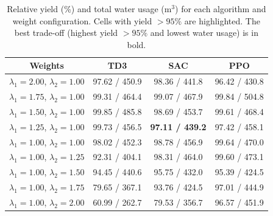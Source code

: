 \begin{table}[ht]
                    \label{tab:rl_wms_results}
                    \caption{Relative yield (\%) and total water usage (m$^3$) for each algorithm and weight configuration. Cells with yield $>95\%$ are highlighted. The best trade-off (highest yield $>95\%$ and lowest water usage) is in bold.}
                    \centering
                    \begin{tabular}{c|ccc}
Weights & TD3 & SAC & PPO \\
\hline
$\lambda_1=2.00$, $\lambda_2=1.00$ & \cellcolor{lightgray}97.62 / 450.9 & \cellcolor{lightgray}98.36 / 441.8 & \cellcolor{lightgray}96.42 / 430.8 \\
$\lambda_1=1.75$, $\lambda_2=1.00$ & \cellcolor{lightgray}99.31 / 464.4 & \cellcolor{lightgray}99.07 / 467.9 & \cellcolor{lightgray}99.84 / 504.8 \\
$\lambda_1=1.50$, $\lambda_2=1.00$ & \cellcolor{lightgray}99.85 / 485.8 & \cellcolor{lightgray}98.69 / 453.7 & \cellcolor{lightgray}99.61 / 468.4 \\
$\lambda_1=1.25$, $\lambda_2=1.00$ & \cellcolor{lightgray}99.73 / 456.5 & \cellcolor{lightgray}\textbf{97.11 / 439.2} & \cellcolor{lightgray}97.42 / 458.1 \\
$\lambda_1=1.00$, $\lambda_2=1.00$ & \cellcolor{lightgray}98.02 / 452.3 & \cellcolor{lightgray}98.78 / 456.9 & \cellcolor{lightgray}99.64 / 470.0 \\
$\lambda_1=1.00$, $\lambda_2=1.25$ & 92.31 / 404.1 & \cellcolor{lightgray}98.31 / 464.0 & \cellcolor{lightgray}99.60 / 473.1 \\
$\lambda_1=1.00$, $\lambda_2=1.50$ & 94.45 / 440.6 & \cellcolor{lightgray}95.75 / 432.0 & \cellcolor{lightgray}95.39 / 424.5 \\
$\lambda_1=1.00$, $\lambda_2=1.75$ & 79.65 / 367.1 & 93.76 / 424.5 & \cellcolor{lightgray}97.01 / 444.9 \\
$\lambda_1=1.00$, $\lambda_2=2.00$ & 60.99 / 262.7 & 79.53 / 356.7 & \cellcolor{lightgray}96.57 / 451.9 \\
\end{tabular}
\caption{Relative yield (\%) and total water usage (m$^3$) for each algorithm and weight configuration. Cells with yield $>95\%$ are highlighted. The best trade-off (highest yield $>95\%$ and lowest water usage) is in bold.}
\end{table}
